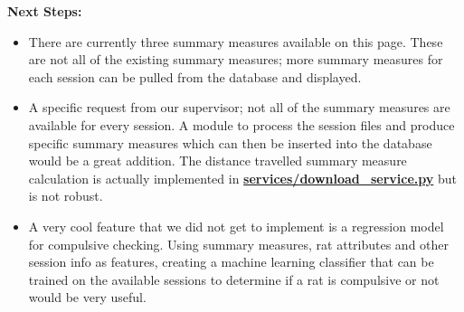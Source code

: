 \documentclass{article}
\begin{document}
\par{\textbf{Next Steps:} }
\begin{itemize}
  \item{There are currently three summary measures available on this page. These are not all of the existing summary measures; more summary measures for each session can be pulled from the database and displayed.}
  \item{A specific request from our supervisor; not all of the summary measures are available for every session. A module to process the session files and produce
  specific summary measures which can then be inserted into the database would be a great addition. The distance travelled summary measure calculation is actually implemented in \href{https://github.com/OCD-Rats-Capstone/OCD-Rat-Infrastructure/blob/main/src/ocd-rat-backend/services/download_service.py}{\textbf{services/download\_service.py}} but is not robust.}
  \item{A very cool feature that we did not get to implement is a regression model for compulsive checking. Using summary measures, rat attributes and other session info as features,
  creating a machine learning classifier that can be trained on the available sessions to determine if a rat is compulsive or not would be very useful.}

\end{itemize}
\end{document}
